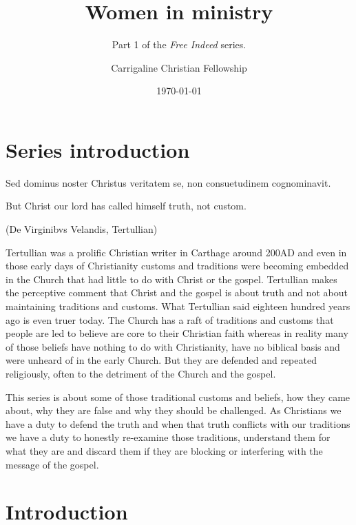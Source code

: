 \documentclass[a5paper, openany, oneside, pagesize,
headings=standardclasses, chapterprefix=false]{scrbook}
\title{\textbf{Women in ministry}}
\subtitle{Part 1 of the \emph{Free Indeed} series.}
\author{Carrigaline Christian Fellowship}
\date{\today}
\begin{document}
\frontmatter
\pagestyle{plain}

\maketitle
        
\setcounter{secnumdepth}{0}
\setcounter{tocdepth}{2}
\tableofcontents
        
\chapter*{Series introduction}      

\begin{myquote}
  
Sed dominus noster Christus veritatem se, non consuetudinem cognominavit.

But Christ our lord has called himself truth, not custom.

(De Virginibvs Velandis, Tertullian)
          
\end{myquote}

Tertullian was a prolific Christian writer in Carthage around 200AD
and even in those early days of Christianity customs and traditions were becoming
embedded in the Church that had little to do with
Christ or the gospel. Tertullian makes the perceptive comment that Christ and the gospel is about truth
and not about maintaining traditions and customs. What Tertullian said eighteen
hundred years ago is even truer today. The Church has a raft of
traditions and customs that people are led to believe are core to
their Christian faith whereas in reality many of those beliefs have
nothing to do with Christianity, have no biblical basis and were
unheard of in the early Church. But they are defended and repeated
religiously, often to the detriment of the Church and the gospel.

This series is about some of those traditional customs and beliefs,
how they came about, why they are false and why they should be
challenged. As Christians we have a duty to defend the
truth and when that truth conflicts with our traditions we
have a duty to honestly re-examine those traditions, understand them for
what they are and discard them if they are blocking or interfering with the message of the
gospel.

\mainmatter
\pagestyle{scrheadings}

\chapter{Introduction}
\end{document}
